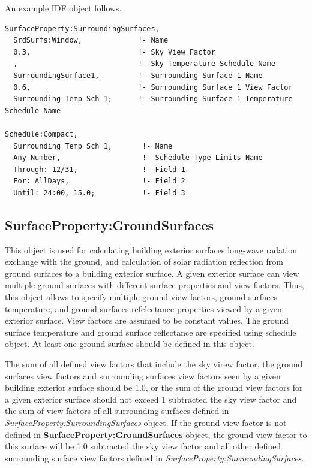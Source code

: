 An example IDF object follows.

\begin{lstlisting}
SurfaceProperty:SurroundingSurfaces,
  SrdSurfs:Window,             !- Name
  0.3,                         !- Sky View Factor
  ,                            !- Sky Temperature Schedule Name
  SurroundingSurface1,         !- Surrounding Surface 1 Name
  0.6,                         !- Surrounding Surface 1 View Factor
  Surrounding Temp Sch 1;      !- Surrounding Surface 1 Temperature Schedule Name

Schedule:Compact,
  Surrounding Temp Sch 1,       !- Name
  Any Number,                   !- Schedule Type Limits Name
  Through: 12/31,               !- Field 1
  For: AllDays,                 !- Field 2
  Until: 24:00, 15.0;           !- Field 3
\end{lstlisting}

\subsection{SurfaceProperty:GroundSurfaces}\label{surfacePropertyGroundSurfaces}

This object is used for calculating building exterior surfaces long-wave radation exchange with the ground, and calculation of solar radiation reflection from ground surfaces to a building exterior surface. A given exterior surface can view multiple ground surfaces with different surface properties and view factors. Thus, this object allows to specify multiple ground view factors, ground surfaces temperature, and ground surfaces refelectance properties viewed by a given exterior surface. View factors are assumed to be constant values. The ground surface temperature and ground surface reflectance are specified using schedule object. At least one ground surface should be defined in this object.

The sum of all defined view factors that include the sky virew factor, the ground surfaces view factors and surrounding surfaces view factors seen by a given building exterior surface should be 1.0, or the sum of the ground view factors for a given exterior surface should not exceed 1 subtracted the sky view factor and the sum of view factors of all surrounding surfaces defined in \textit{SurfaceProperty:SurroundingSurfaces} object. If the ground view factor is not defined in \textbf{SurfaceProperty:GroundSurfaces} object, the ground view factor to this surface will be 1.0 subtracted the sky view factor and all other defined surrounding surface view factors defined in \textit{SurfaceProperty:SurroundingSurfaces}.

